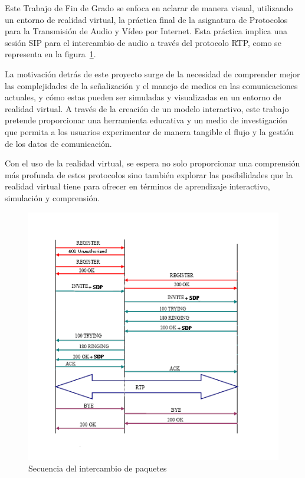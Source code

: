 \documentclass[a4paper, 12pt]{book}
\begin{document}
\bigskip

Este Trabajo de Fin de Grado se enfoca en aclarar de manera visual, utilizando un entorno de realidad virtual, la práctica final 
de la asignatura de Protocolos para la Transmisión de Audio y Vídeo por Internet. Esta práctica implica una sesión SIP para el 
intercambio de audio a través del protocolo RTP, como se representa en la figura~\ref{fig:Secuencia_Paquetes_intro}.

\bigskip

La motivación detrás de este proyecto surge de la necesidad de comprender mejor las complejidades de la señalización y 
el manejo de medios en las comunicaciones actuales, y cómo estas pueden ser simuladas y visualizadas en un entorno de realidad virtual. 
A través de la creación de un modelo interactivo, este trabajo pretende proporcionar una herramienta educativa y un medio de 
investigación que permita a los usuarios experimentar de manera tangible el flujo y la gestión de los datos de comunicación.

\bigskip

Con el uso de la realidad virtual, se espera no solo proporcionar una comprensión más profunda de estos protocolos sino también explorar 
las posibilidades que la realidad virtual tiene para ofrecer en términos de aprendizaje interactivo, simulación y comprensión.

\begin{figure}
  \centering
  \includegraphics[width=15cm, keepaspectratio]{img/resultados/Secuencia_Paquetes.png}
  \caption{Secuencia del intercambio de paquetes}
  \label{fig:Secuencia_Paquetes_intro}
\end{figure}
\end{document}
